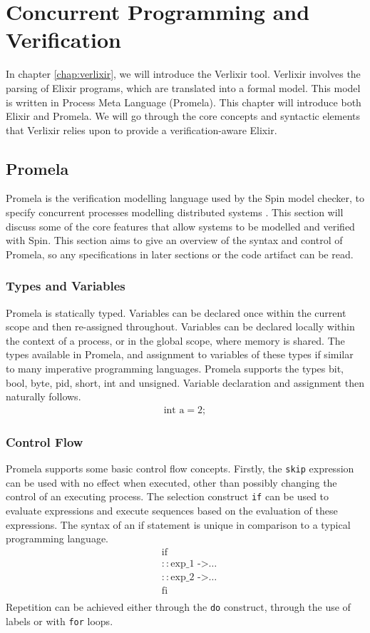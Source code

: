 \chapter{Concurrent Programming and Verification}
In chapter \ref{chap:verlixir}, we will introduce the Verlixir tool. Verlixir involves the parsing of Elixir programs, which are translated into a formal model. This model is written in Process Meta Language (Promela). This chapter will introduce both Elixir and Promela. We will go through the core concepts and syntactic elements that Verlixir relies upon to provide a verification-aware Elixir. 
\section{Promela} \label{sec:promela}
Promela is the verification modelling language used by the Spin model checker, to specify concurrent processes modelling distributed systems \cite{spin}. This section will discuss some of the core features that allow systems to be modelled and verified with Spin. This section aims to give an overview of the syntax and control of Promela, so any specifications in later sections or the code artifact can be read.
\subsection{Types and Variables}
Promela is statically typed. Variables can be declared once within the current scope and then re-assigned throughout. Variables can be declared locally within the context of a process, or in the global scope, where memory is shared. The types available in Promela, and assignment to variables of these types if similar to many imperative programming languages. Promela supports the types bit, bool, byte, pid, short, int and unsigned. Variable declaration and assignment then naturally follows.
\[
\begin{aligned}
\text{int a} = 2;
\end{aligned}
\]
\subsection{Control Flow}
Promela supports some basic control flow concepts. Firstly, the \texttt{skip} expression can be used with no effect when executed, other than possibly changing the control of an executing process. The selection construct \texttt{if} can be used to evaluate expressions and execute sequences based on the evaluation of these expressions. The syntax of an if statement is unique in comparison to a typical programming language.
\[
\begin{aligned}
& \text{if} \\
& :: \text{exp\_1 ->} \dots \\
& :: \text{exp\_2 ->} \dots \\
& \text{fi} \\
\end{aligned}    
\]
Repetition can be achieved either through the \texttt{do} construct, through the use of labels or with \texttt{for} loops.
